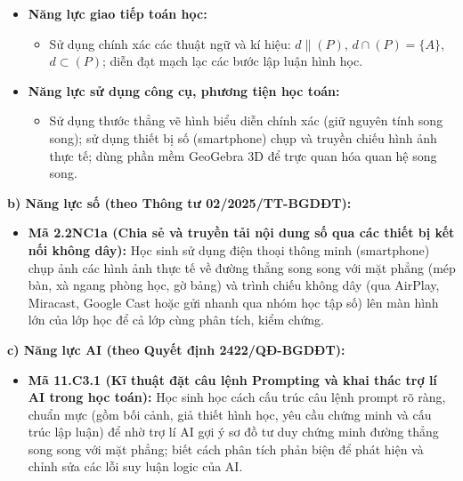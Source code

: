 \documentclass[12pt, a4paper]{article}
\begin{document}
\begin{itemize}[leftmargin=1.5em]
\begin{itemize}
        \item Vận dụng được kiến thức về đường thẳng song song với mặt phẳng để mô tả các hình ảnh thực tiễn: thanh rèm cửa song song với sàn nhà/trần nhà, xà gồ mái nhà song song với mặt sàn, dây cáp điện ngắm dọc theo tuyến đường, lan can cầu thang.
    \end{itemize}
    \item \textbf{Năng lực giao tiếp toán học:}
    \begin{itemize}
        \item Sử dụng chính xác các thuật ngữ và kí hiệu: $d \parallel (P)$, $d \cap (P) = \{A\}$, $d \subset (P)$; diễn đạt mạch lạc các bước lập luận hình học.
    \end{itemize}
    \item \textbf{Năng lực sử dụng công cụ, phương tiện học toán:}
    \begin{itemize}
        \item Sử dụng thước thẳng vẽ hình biểu diễn chính xác (giữ nguyên tính song song); sử dụng thiết bị số (smartphone) chụp và truyền chiếu hình ảnh thực tế; dùng phần mềm GeoGebra 3D để trực quan hóa quan hệ song song.
    \end{itemize}
\end{itemize}

\textbf{b) Năng lực số (theo Thông tư 02/2025/TT-BGDĐT):}
\begin{itemize}[leftmargin=1.5em]
    \item \textbf{Mã 2.2NC1a (Chia sẻ và truyền tải nội dung số qua các thiết bị kết nối không dây):} Học sinh sử dụng điện thoại thông minh (smartphone) chụp ảnh các hình ảnh thực tế về đường thẳng song song với mặt phẳng (mép bàn, xà ngang phòng học, gờ bảng) và trình chiếu không dây (qua AirPlay, Miracast, Google Cast hoặc gửi nhanh qua nhóm học tập số) lên màn hình lớn của lớp học để cả lớp cùng phân tích, kiểm chứng.
\end{itemize}

\textbf{c) Năng lực AI (theo Quyết định 2422/QĐ-BGDĐT):}
\begin{itemize}[leftmargin=1.5em]
    \item \textbf{Mã 11.C3.1 (Kĩ thuật đặt câu lệnh Prompting và khai thác trợ lí AI trong học toán):} Học sinh học cách cấu trúc câu lệnh prompt rõ ràng, chuẩn mực (gồm bối cảnh, giả thiết hình học, yêu cầu chứng minh và cấu trúc lập luận) để nhờ trợ lí AI gợi ý sơ đồ tư duy chứng minh đường thẳng song song với mặt phẳng; biết cách phân tích phản biện để phát hiện và chỉnh sửa các lỗi suy luận logic của AI.
\end{itemize}
\end{document}
